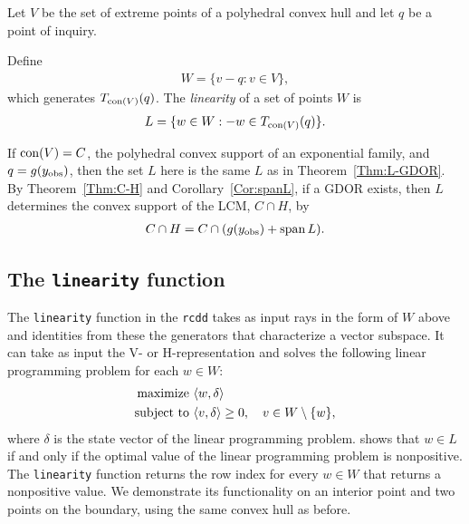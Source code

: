 Let $V$ be the set of extreme points of a polyhedral convex hull and let $q$ be a point of inquiry.

Define 
\begin{align*}
W = \{ v - q: v \in V \},
\end{align*}
which generates $T_{\operatorname{con}(V)}(q)$.
The \emph{linearity} of a set of points $W$ is
\begin{align*}
	L = \{ w \in W: -w \in T_{\operatorname{con}(V)}(q) \}.
\end{align*}

 If $\operatorname{con}( V ) = C$, the
polyhedral convex support of an exponential family, and $q = g(y_{\text{obs}})$, then the set 
$L$ here is the same $L$ as in Theorem~\ref{Thm:L-GDOR}.    
By Theorem~\ref{Thm:C-H} and Corollary~\ref{Cor:spanL}, if a GDOR 
exists, then $L$  
determines the convex support of the LCM, $C \cap H$, by
\begin{align*}
	C \cap H = C \cap (g(y_{\text{obs}}) + \operatorname{span} L).
\end{align*}

\subsection{The \texttt{linearity} function}
The \texttt{linearity} function in the \texttt{rcdd} takes as input rays in 
the form of $W$ above and identities from these the generators that characterize
a vector subspace.  It can take as input the V- or H-representation and solves the 
following linear programming problem for each $w \in W$:
\begin{align*}
	\text{maximize } 	&\langle w,\delta \rangle\\
	\text{subject to } 	&\langle v,\delta \rangle \geq 0, \quad v \in W \setminus \{w\},
\end{align*}
where $\delta$ is the state vector of the linear programming problem.  \citet{Geyer:gdor}
shows that $w \in L$ if and only if the optimal value of the linear programming problem is 
nonpositive.  The \texttt{linearity} function returns the row index for every $w \in W$
that returns a nonpositive value.
We demonstrate its functionality on an interior
point and two points on the boundary, using the same convex hull as before.

